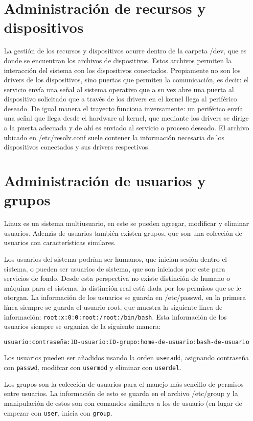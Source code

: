 \documentclass[11pt,letterpaper]{article} 	%
\begin{document}
\section*{Administración de recursos y dispositivos}
La gestión de los recursos y dispositivos ocurre dentro de la carpeta /dev, que es donde se encuentran los archivos de dispositivos. Estos archivos permiten la interacción del sistema con los dispositivos conectados. Propiamente no son los drivers de los dispositivos, sino puertas que permiten la comunicación, es decir: el servicio envía una señal al sistema operativo que a su vez abre una puerta al dispositivo solicitado que a través de los drivers en el kernel llega al periférico deseado. De igual manera el trayecto funciona inversamente: un periférico envía una señal que llega desde el hardware al kernel, que mediante los drivers se dirige a la puerta adecuada y de ahí es enviado al servicio o proceso deseado. El archivo ubicado en /etc/resolv.conf suele contener la información necesaria de los dispositivos conectados y sus drivers respectivos.

\section*{Administración de usuarios y grupos}
Linux es un sistema multiusuario, en este se pueden agregar, modificar y eliminar usuarios. Además de usuarios también existen grupos, que son una colección de usuarios con características similares.\par
Los usuarios del sistema podrían ser humanos, que inician sesión dentro el sistema, o pueden ser usuarios de sistema, que son iniciados por este para servicios de fondo. Desde esta perspectiva no existe distinción de humano o máquina para el sistema, la distinción real está dada por los permisos que se le otorgan. La información de los usuarios se guarda en /etc/passwd, en la primera línea siempre se guarda el usuario root, que muestra la siguiente linea de información: \texttt{root:x:0:0:root:/root:/bin/bash}. Esta información de los usuarios siempre se organiza de la siguiente manera:
\begin{center}
	\texttt{usuario:contraseña:ID-usuario:ID-grupo:home-de-usuario:bash-de-usuario}
\end{center}
Los usuarios pueden ser añadidos usando la orden \texttt{useradd}, asignando contraseña con \texttt{passwd}, modifcar con \texttt{usermod} y eliminar con \texttt{userdel}.\par
Los grupos son la colección de usuarios para el manejo más sencillo de permisos entre usuarios. La información de esto se guarda en el archivo /etc/group y la manipulación de estos son con comandos similares a los de usuario (en lugar de empezar con \texttt{user}, inicia con \texttt{group}.
\end{document}

